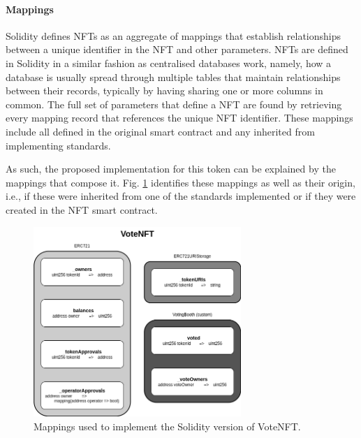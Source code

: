 \documentclass[../main.tex]{subfiles}
\begin{document}
\paragraph{Mappings}
Solidity defines NFTs as an aggregate of mappings that establish relationships between a unique identifier in the NFT and other parameters. NFTs are defined in Solidity in a similar fashion as centralised databases work, namely, how a  database is usually spread through multiple tables that maintain relationships between their records, typically by having sharing one or more columns in common. The full set of parameters that define a NFT are found by retrieving every mapping record that references the unique NFT identifier. These mappings include all defined in the original smart contract and any inherited from implementing standards.
\par
As such, the proposed implementation for this token can be explained by the mappings that compose it. Fig. \ref{fig:votenft_mappings} identifies these mappings as well as their origin, i.e., if these were inherited from one of the standards implemented or if they were created in the NFT smart contract.

\begin{figure}[htp]
    \centering
    \includegraphics[width=0.7\textwidth]{../Images/01_VoteNFT_Mappings.png}
    \caption{Mappings used to implement the Solidity version of VoteNFT.}
    \label{fig:votenft_mappings}
\end{figure}
\end{document}
